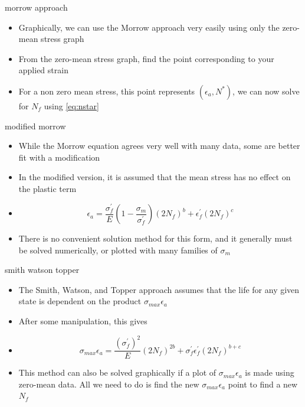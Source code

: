 \documentclass[10pt]{beamer}
\begin{document}
\begin{frame}{morrow approach}
	\begin{itemize}[<+->]
		\item Graphically, we can use the Morrow approach very easily using only the zero-mean stress graph
		\item From the zero-mean stress graph, find the point corresponding to your applied strain
		\item For a non zero mean stress, this point represents $(\epsilon_a, N^*)$, we can now solve for $N_f$ using \ref{eq:nstar}
	\end{itemize}
\end{frame}

\begin{frame}{modified morrow}
	\begin{itemize}[<+->]
		\item While the Morrow equation agrees very well with many data, some are better fit with a modification
		\item In the modified version, it is assumed that the mean stress has no effect on the plastic term
		\item[] \begin{equation}
		\epsilon_a = \frac{\sigma_f^\prime}{E}\left(1-\frac{\sigma_m}{\sigma_f^\prime}\right)(2N_f)^b + \epsilon_f^\prime (2N_f)^c
		\end{equation}
		\item There is no convenient solution method for this form, and it generally must be solved numerically, or plotted with many families of $\sigma_m$
	\end{itemize}
\end{frame}

\begin{frame}{smith watson topper}
	\begin{itemize}[<+->]
		\item The Smith, Watson, and Topper approach assumes that the life for any given state is dependent on the product $\sigma_{max} \epsilon_a$
		\item After some manipulation, this gives
		\item[] \begin{equation}
		\sigma_{max} \epsilon_a = \frac{\left(\sigma_f^\prime\right)^2}{E}(2N_f)^{2b} + \sigma_f^\prime \epsilon_f^\prime (2N_f)^{b+c}
		\end{equation}
		\item This method can also be solved graphically if a plot of $\sigma_{max} \epsilon_a$ is made using zero-mean data. All we need to do is find the new $\sigma_{max} \epsilon_a$ point to find a new $N_f$
	\end{itemize}
\end{frame}
\end{document}
